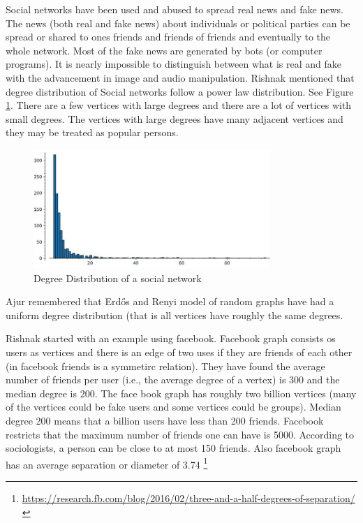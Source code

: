  Social networks have been used and abused to spread real news and fake news. The news (both real and fake news) about individuals or political parties can be spread or shared to 
 ones friends and friends of friends and eventually to the whole network. Most of the fake news are generated by bots (or computer programs). It is nearly impossible to distinguish between what is real and fake with the advancement in image and audio manipulation.
 Rishnak mentioned that degree distribution of Social networks follow a power law distribution. See Figure \ref{21p1}.  There are a few vertices with large degrees and there are a lot of vertices with small degrees.  The vertices with large degrees have many adjacent vertices and they may be treated as popular persons.
 \begin{figure}
 \begin{center}
\includegraphics[width=0.8\textwidth]{degreepowerlawdist.jpg}
\caption{Degree Distribution of a social network}\label{21p1}
\end{center}

\end{figure}
\begin{newpage}
\end{newpage}
 
 Ajur remembered that Erd\H{o}s and Renyi model of random graphs have had a uniform degree distribution (that is all vertices have roughly the same degrees.
 
 Rishnak started with an example using facebook. Facebook graph consists os users as vertices and there is an edge of two uses if they are friends of each other (in facebook friends is a symmetirc relation). They
 have found the average number of friends per user (i.e., the average degree of a vertex) is 300 and the median degree is 200. The face book graph has roughly two billion vertices (many of the vertices could be fake users and some vertices could be groups). Median degree 200 means that a billion users have less than 200 friends. Facebook restricts that the maximum number of friends one can have is 5000. According to sociologists, a person can be close to at most 150 friends. Also facebook graph has an average separation or diameter of 3.74 \footnote{\url{https://research.fb.com/blog/2016/02/three-and-a-half-degrees-of-separation/}}
 
